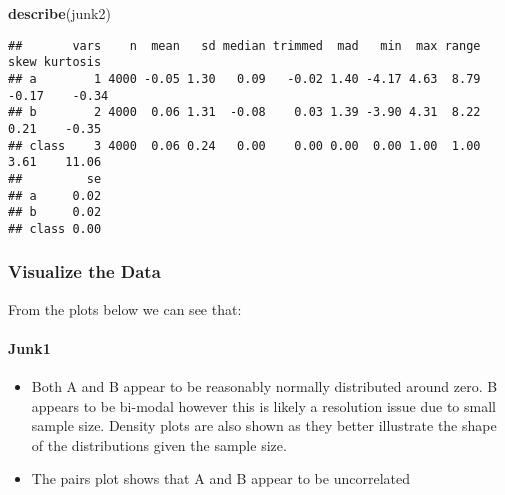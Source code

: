 \documentclass[]{article}
\newenvironment{Shaded}{\begin{snugshade}}{\end{snugshade}}
\newcommand{\KeywordTok}[1]{\textcolor[rgb]{0.13,0.29,0.53}{\textbf{#1}}}
\newcommand{\DataTypeTok}[1]{\textcolor[rgb]{0.13,0.29,0.53}{#1}}
\newcommand{\DecValTok}[1]{\textcolor[rgb]{0.00,0.00,0.81}{#1}}
\newcommand{\StringTok}[1]{\textcolor[rgb]{0.31,0.60,0.02}{#1}}
\newcommand{\OperatorTok}[1]{\textcolor[rgb]{0.81,0.36,0.00}{\textbf{#1}}}
\newcommand{\NormalTok}[1]{#1}
\providecommand{\tightlist}{%
  \setlength{\itemsep}{0pt}\setlength{\parskip}{0pt}}
\let\oldparagraph\paragraph
\renewcommand{\paragraph}[1]{\oldparagraph{#1}\mbox{}}
\begin{document}
\begin{Shaded}
\begin{Highlighting}[]
\KeywordTok{describe}\NormalTok{(junk2)}
\end{Highlighting}
\end{Shaded}

\begin{verbatim}
##       vars    n  mean   sd median trimmed  mad   min  max range  skew kurtosis
## a        1 4000 -0.05 1.30   0.09   -0.02 1.40 -4.17 4.63  8.79 -0.17    -0.34
## b        2 4000  0.06 1.31  -0.08    0.03 1.39 -3.90 4.31  8.22  0.21    -0.35
## class    3 4000  0.06 0.24   0.00    0.00 0.00  0.00 1.00  1.00  3.61    11.06
##         se
## a     0.02
## b     0.02
## class 0.00
\end{verbatim}

\subsubsection{Visualize the Data}\label{visualize-the-data}

From the plots below we can see that:

\paragraph{Junk1}\label{junk1}

\begin{itemize}
\tightlist
\item
  Both A and B appear to be reasonably normally distributed around zero.
  B appears to be bi-modal however this is likely a resolution issue due
  to small sample size. Density plots are also shown as they better
  illustrate the shape of the distributions given the sample size.
\item
  The pairs plot shows that A and B appear to be uncorrelated
\end{itemize}

\begin{Shaded}
\end{Shaded}
\end{document}
